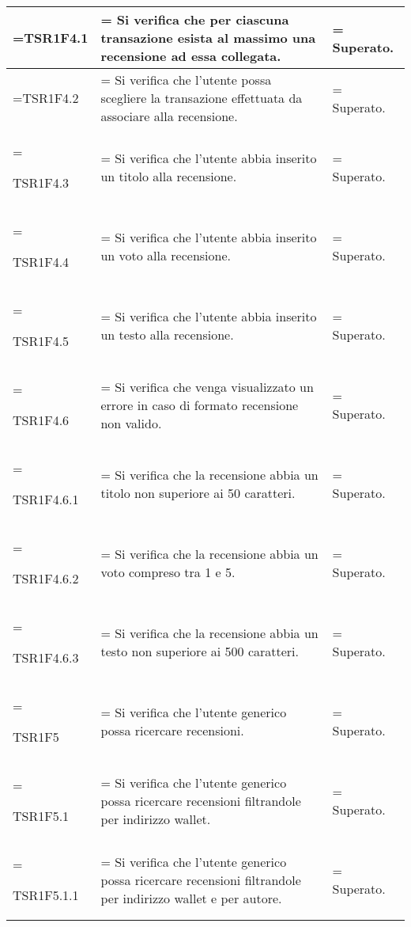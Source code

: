 \begin{xltabular}{\textwidth} {
            >{\hsize\linewidth=\hsize}X
            >{\hsize\linewidth=\hsize}X
            >{\hsize\linewidth=\hsize}X
        }
        TSR1F4.1&
        Si verifica che per ciascuna transazione esista al massimo una recensione ad essa collegata.&
        Superato.
        \\ \hline
        
        TSR1F4.2&
        Si verifica che l'utente possa scegliere la transazione effettuata da associare alla recensione.&
        Superato.
        \\ \hline

        TSR1F4.3&
        Si verifica che l'utente abbia inserito un titolo alla recensione.&
        Superato.
        \\ \hline

        TSR1F4.4&
        Si verifica che l'utente abbia inserito un voto alla recensione.&
        Superato.
        \\ \hline

        TSR1F4.5&
        Si verifica che l'utente abbia inserito un testo alla recensione.&
        Superato.
        \\ \hline

        TSR1F4.6&
        Si verifica che venga visualizzato un errore in caso di formato recensione non valido.&
        Superato.
        \\ \hline
        
        TSR1F4.6.1&
        Si verifica che la recensione abbia un titolo non superiore ai 50 caratteri.&
        Superato.
        \\ \hline

        TSR1F4.6.2&
        Si verifica che la recensione abbia un voto compreso tra 1 e 5.&
        Superato.
        \\ \hline

        TSR1F4.6.3&
        Si verifica che la recensione abbia un testo non superiore ai 500 caratteri.&
        Superato.
        \\ \hline

        TSR1F5&
        Si verifica che l'utente generico possa ricercare recensioni.&
        Superato.
        \\ \hline

        TSR1F5.1&
        Si verifica che l'utente generico possa ricercare recensioni filtrandole per indirizzo wallet.&
        Superato.
        \\ \hline
        
        TSR1F5.1.1&
        Si verifica che l'utente generico possa ricercare recensioni filtrandole per indirizzo wallet e per autore.&
        Superato.
        \\ \hline
        

\end{xltabular}
